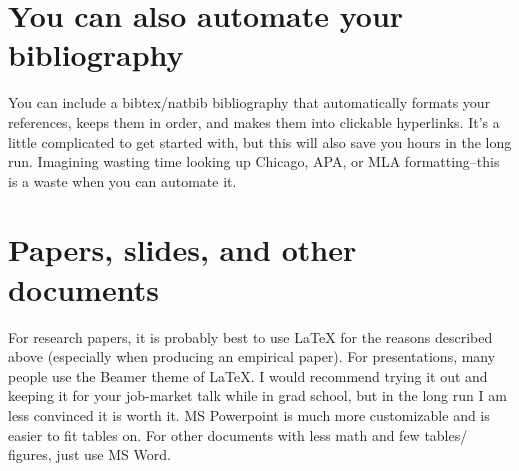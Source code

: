 \documentclass{article}
\begin{document}
\section{You can also automate your bibliography}

You can include a bibtex/natbib bibliography that automatically formats your references, keeps them in order, and makes them into clickable hyperlinks. It's a little complicated to get started with, but this will also save you hours in the long run.  Imagining wasting time looking up Chicago, APA, or MLA formatting--this is a waste when you can automate it.

\section{Papers, slides, and other documents}
For research papers, it is probably best to use LaTeX for the reasons described above (especially when producing an empirical paper).  For presentations, many people use the Beamer theme of LaTeX.  I would recommend trying it out and keeping it for your job-market talk while in grad school, but in the long run I am less convinced it is worth it.  MS Powerpoint is much more customizable and is easier to fit tables on.  For other documents with less math and few tables/ figures, just use MS Word.



\end{document}
